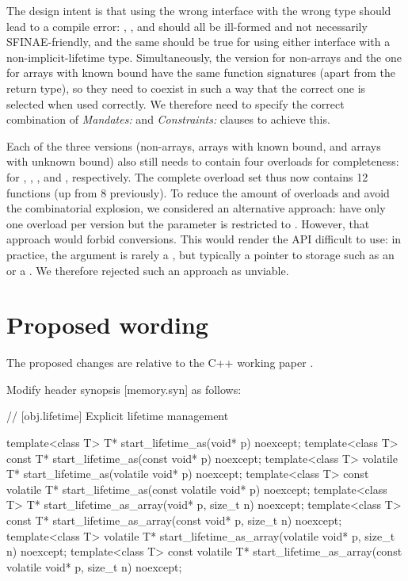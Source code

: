 The design intent is that using the wrong interface with the wrong type should lead to a compile error: , , and  should all be ill-formed and not necessarily SFINAE-friendly, and the same should be true for using either interface with a non-implicit-lifetime type. Simultaneously, the version for non-arrays and the one for arrays with known bound have the same function signatures (apart from the return type), so they need to coexist in such a way that the correct one is selected when used correctly. We therefore need to specify the correct combination of \emph{Mandates:} and \emph{Constraints:} clauses to achieve this.

Each of the three versions (non-arrays, arrays with known bound, and arrays with unknown bound) also still needs to contain four overloads for completeness: for , , , and , respectively. The complete overload set thus now contains 12 functions (up from 8 previously). To reduce the amount of overloads and avoid the combinatorial explosion, we considered an alternative approach: have only one overload per version but the parameter is restricted to . However, that approach would forbid conversions. This would render the API difficult to use: in practice, the argument is rarely a , but typically a pointer to storage such as an  or a . We therefore rejected such an approach as unviable.


\section{Proposed wording}
\label{sec:wording}

The proposed changes are relative to the C++ working paper \cite{N4917}.

Modify header  synopsis [memory.syn] as follows:


\begin{codeblock}
// [obj.lifetime] Explicit lifetime management
\end{codeblock}
\begin{removedblock}
\begin{codeblock}
template<class T>
  T* start_lifetime_as(void* p) noexcept;
template<class T>
  const T* start_lifetime_as(const void* p) noexcept;
template<class T>
  volatile T* start_lifetime_as(volatile void* p) noexcept;
template<class T>
  const volatile T* start_lifetime_as(const volatile void* p) noexcept;
template<class T>
  T* start_lifetime_as_array(void* p, size_t n) noexcept;
template<class T>
  const T* start_lifetime_as_array(const void* p, size_t n) noexcept;
template<class T>
  volatile T* start_lifetime_as_array(volatile void* p, size_t n) noexcept;
template<class T>
  const volatile T* start_lifetime_as_array(const volatile void* p, size_t n) noexcept;
\end{codeblock}
\end{removedblock}

